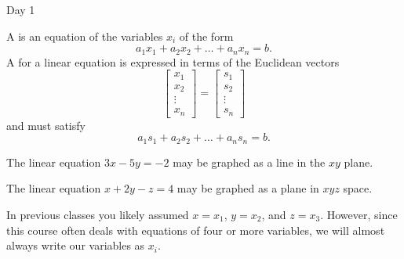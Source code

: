 
\begin{applicationActivities}{Day 1}

\begin{definition}
A  is an equation of the variables \(x_i\) of the form
\[
a_1x_1+a_2x_2+\dots+a_nx_n=b
.\]
A 
for a linear equation is expressed in terms of the Euclidean vectors
\[
  \begin{bmatrix}
    x_1 \\
    x_2 \\
    \vdots \\
    x_n
  \end{bmatrix}=
  \begin{bmatrix}
    s_1 \\
    s_2 \\
    \vdots \\
    s_n
  \end{bmatrix}
\]
and must satisfy
\[
a_1s_1+a_2s_2+\dots+a_ns_n=b
.\]
\end{definition}

\begin{observation}
The linear equation \(3x-5y=-2\) may be graphed as a line in the \(xy\) plane.

\begin{center}
\end{center}

The linear equation \(x+2y-z=4\) may be graphed as a plane in \(xyz\) space.
\end{observation}

\begin{remark}
In previous classes you likely assumed \(x=x_1\), \(y=x_2\), and \(z=x_3\).
However, since this course often deals with equations of four or more
variables, we will almost always write our variables as \(x_i\).
\end{remark}


\end{applicationActivities}
